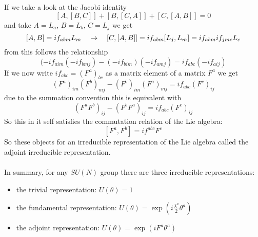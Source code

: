 If we take a look at the Jacobi identity
\[ [A,[B,C]] + [B,[C,A]] + [C,[A,B]] = 0\]
and take $A = L_a$, $B= L_b$, $C=L_j$ we get
\[ [A,B] = i f_{abm} L_m ~~~\rightarrow~~~ [C,[A,B]] = i f_{abm}[L_j,L_m] = if_{abm}if_{jmc} L_c\]
from this follows the relationship
\[ (-if_{aim}(-if_{bmj}) - (-if_{bim})(-if_{amj}) = if_{abc}(-if_{aij})\]
If we now write $if_{abc} = (F^a)_{bc}$ as a matrix element of a matrix $F^a$ we get
\[ (F^a)_{im} (F^b)_{mj} - (F^b)_{im}(F^a)_{mj} = i f_{abc} (F^c)_{ij}\]
due to the summation convention this is equivalent with
\[ (F^aF^b)_{ij} - (F^bF^a)_{ij} = if_{abc}(F^c)_{ij}\]
So this in it self satisfies the commutation relation of the Lie algebra:
\[ [F^a, F^b] = i f^{abc} F^c\]
So these objects for an irreducible representation of the Lie algebra called the adjoint irreducible representation.\\
\\
In summary, for any $SU(N)$ group there are three irreducible representations:
\begin{itemize}
\item the trivial representation: $U(\theta) = 1$
\item the fundamental representation: $U(\theta) = \exp\left( i \frac{\lambda^a}{2} \theta^a\right)$
\item the adjoint representation: $U(\theta) = \exp \left( i F^a \theta ^a\right)$
\end{itemize}



